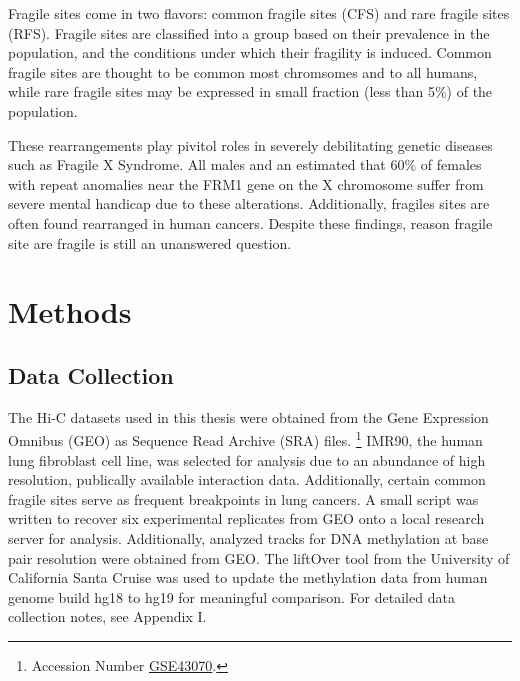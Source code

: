 \documentclass[phd,tocprelim]{cornell}
\begin{document}
Fragile sites come in two flavors: common fragile sites (CFS) and rare fragile
sites (RFS).  Fragile sites are classified into a group based on their
prevalence in the population, and the conditions under which their fragility
is induced\cite{leyden2008}.  Common fragile sites are thought to be common
most chromsomes and to all humans, while rare fragile sites may be expressed
in small fraction (less than 5\%) of the population\cite{wells2006}.

These
rearrangements play pivitol roles in severely debilitating genetic diseases
such as Fragile X Syndrome.  All males and an estimated that 60\% of females
with repeat anomalies near the FRM1 gene on the X chromosome suffer
from severe mental handicap due to these alterations\cite{sutherland1995}.
Additionally, fragiles sites are often found rearranged in human
cancers\cite{glover2005}.  Despite these findings, reason fragile site are
fragile is still an unanswered question.



\chapter{Methods}

\section{Data Collection}

The Hi-C datasets used in this thesis were obtained from the Gene
Expression Omnibus (GEO)\cite{edgar2002} as Sequence Read Archive (SRA) files.%
\footnote{Accession Number \href{http://www.ncbi.nlm.nih.gov/geo/query/acc.cgi?acc=GSE43070}{GSE43070}.}
IMR90, the human lung fibroblast cell line, was selected for analysis due to
an abundance of high resolution, publically available interaction data.
Additionally, certain common fragile sites serve as frequent breakpoints in
lung cancers\cite{tunca2002}\cite{dhillon2003}.  A small script was written to
recover six experimental replicates from GEO onto a local research server for
analysis.  Additionally, analyzed tracks for DNA methylation at base pair
resolution were obtained from GEO\cite{lister2009}.  The liftOver tool from
the University of California Santa Cruise was used to update the methylation
data from human genome build hg18 to hg19 for meaningful comparison\cite{hinrichs2006}.
For detailed data collection notes, see Appendix I.
\end{document}
